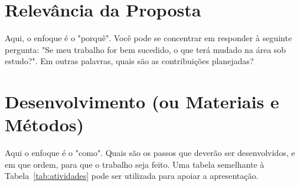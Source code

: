 \documentclass[a4paper,titlepage,12pt]{article}
\begin{document}
\section{Relevância da Proposta}
\label{sec:relev}

Aqui, o enfoque é o "porquê". Você pode se concentrar em responder à seguinte pergunta: "Se meu trabalho for bem sucedido, o que terá mudado na área sob estudo?". Em outras palavras, quais são as contribuições planejadas?

\section{Desenvolvimento (ou Materiais e Métodos)}
\label{sec:metodologia}


Aqui o enfoque é o "como".  Quais são os passos que deverão ser desenvolvidos, e em que ordem, para que o trabalho seja feito. Uma tabela semelhante à Tabela~\ref{tab:atividades} pode ser utilizada para apoiar a apresentação.
\end{document}
